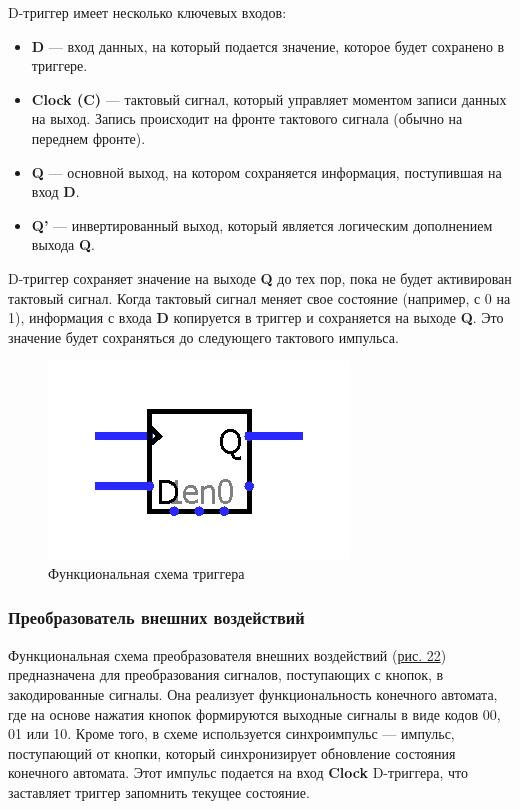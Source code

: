 \documentclass[11pt,a4paper,final]{article} %
\begin{document}
D-триггер имеет несколько ключевых входов:
\begin{itemize}
	\item \textbf{D} — вход данных, на который подается значение, которое будет сохранено в триггере.
	\item \textbf{Clock (C)} — тактовый сигнал, который управляет моментом записи данных на выход. Запись происходит на фронте тактового сигнала (обычно на переднем фронте).
	\item \textbf{Q} — основной выход, на котором сохраняется информация, поступившая на вход \textbf{D}.
	\item \textbf{Q'} — инвертированный выход, который является логическим дополнением выхода \textbf{Q}.
\end{itemize}
 
D-триггер сохраняет значение на выходе \textbf{Q} до тех пор, пока не будет активирован тактовый сигнал. Когда тактовый сигнал меняет свое состояние (например, с 0 на 1), информация с входа \textbf{D} копируется в триггер и сохраняется на выходе \textbf{Q}. Это значение будет сохраняться до следующего тактового импульса.

\begin{figure}[H]
	\centering
	\includegraphics[width=0.35 \linewidth]{img/trigger.png}
	\caption{Функциональная схема триггера}
	\label{fig:trigger}
\end{figure}


\subsubsection{Преобразователь внешних воздействий}

Функциональная схема преобразователя внешних воздействий (\hyperref[fig:influence]{рис. 22}) предназначена для преобразования сигналов, поступающих с кнопок, в закодированные сигналы. Она реализует функциональность конечного автомата, где на основе нажатия кнопок формируются выходные сигналы в виде кодов 00, 01 или 10. Кроме того, в схеме используется синхроимпульс — импульс, поступающий от кнопки, который синхронизирует обновление состояния конечного автомата. Этот импульс подается на вход \textbf{Clock} D-триггера, что заставляет триггер запомнить текущее состояние.
\end{document}
